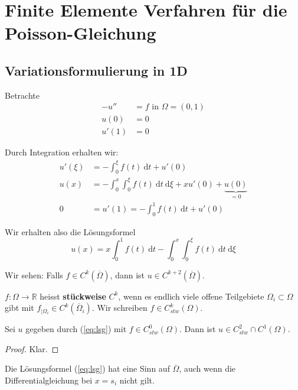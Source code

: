 \chapter{Finite Elemente Verfahren für die Poisson-Gleichung}
\section{Variationsformulierung in 1D}

Betrachte
\begin{align*}
-u'' &= f \text{ in } \Omega = (0,1) \\
u(0) &= 0 \\ 
u'(1) &= 0
\end{align*}

Durch Integration erhalten wir:
\begin{align*}
u'(\xi) &= - \int_0^\xi f(t) \ \mathrm dt + u'(0) \\
u(x) &= - \int_0^x \int_0^\xi f(t) \ \mathrm dt \ \mathrm d\xi + x u'(0) + \underbrace{u(0)}_{=0} \\
0 &= u'(1) = - \int_0^1 f(t) \ \mathrm dt + u'(0)
\end{align*}

Wir erhalten also die Lösungsformel
\[
u(x) = x \int_0^1 f(t) \ \mathrm dt - \int_0^x \int_0^\xi f(t) \ \mathrm dt \ \mathrm d\xi \label{eq:lsg}
\]

\begin{bem}
Wir sehen: Falls $f \in C^k(\overline \Omega)$, dann ist $u \in C^{k+2} (\overline \Omega)$.
\end{bem}

\begin{defi}
$f: \Omega \to \mathbb R$ heisst \textbf{stückweise} $C^k$, wenn es endlich viele offene 
Teilgebiete $\Omega_i \subset \Omega$ gibt mit $f_{|\Omega_i} \in C^k(\overline \Omega_i)$.
Wir schreiben $f \in C^k_{stw}(\Omega)$.
\end{defi}

\begin{satz}
Sei $u$ gegeben durch (\ref{eq:lsg}) mit $f \in C^0_{stw}(\Omega)$. Dann ist
$u \in C^2_{stw} \cap C^1(\Omega)$.
\end{satz}
\begin{proof}
Klar.
\end{proof}

\begin{bem}
Die Lösungsformel (\ref{eq:lsg}) hat eine Sinn auf $\overline \Omega$, auch wenn die 
Differentialgleichung bei $x = s_i$ nicht gilt.
\end{bem}

